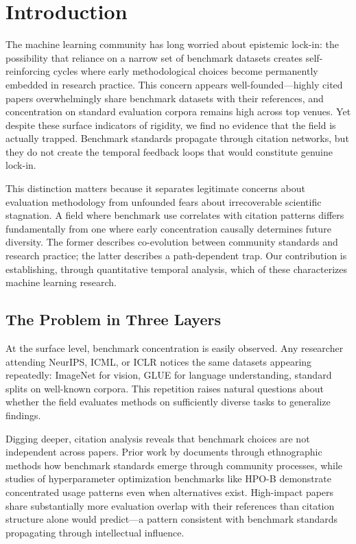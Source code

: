 \section{Introduction}

The machine learning community has long worried about epistemic lock-in: the possibility that reliance on a narrow set of benchmark datasets creates self-reinforcing cycles where early methodological choices become permanently embedded in research practice. This concern appears well-founded---highly cited papers overwhelmingly share benchmark datasets with their references, and concentration on standard evaluation corpora remains high across top venues. Yet despite these surface indicators of rigidity, we find no evidence that the field is actually trapped. Benchmark standards propagate through citation networks, but they do not create the temporal feedback loops that would constitute genuine lock-in.

This distinction matters because it separates legitimate concerns about evaluation methodology from unfounded fears about irrecoverable scientific stagnation. A field where benchmark use correlates with citation patterns differs fundamentally from one where early concentration causally determines future diversity. The former describes co-evolution between community standards and research practice; the latter describes a path-dependent trap. Our contribution is establishing, through quantitative temporal analysis, which of these characterizes machine learning research.

\subsection{The Problem in Three Layers}

At the surface level, benchmark concentration is easily observed. Any researcher attending NeurIPS, ICML, or ICLR notices the same datasets appearing repeatedly: ImageNet for vision, GLUE for language understanding, standard splits on well-known corpora. This repetition raises natural questions about whether the field evaluates methods on sufficiently diverse tasks to generalize findings.

Digging deeper, citation analysis reveals that benchmark choices are not independent across papers. Prior work by \citet{engdahl2024benchmark} documents through ethnographic methods how benchmark standards emerge through community processes, while studies of hyperparameter optimization benchmarks like HPO-B \citep{pineda2021hpob} demonstrate concentrated usage patterns even when alternatives exist. High-impact papers share substantially more evaluation overlap with their references than citation structure alone would predict---a pattern consistent with benchmark standards propagating through intellectual influence.

